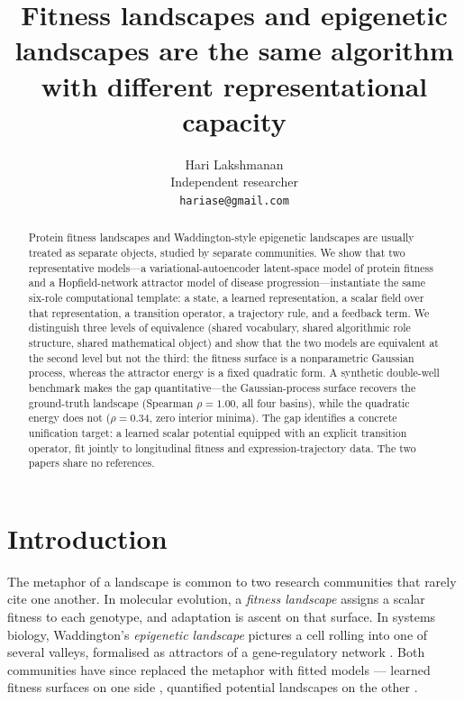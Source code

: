 \documentclass[11pt]{article}
\title{\bfseries Fitness landscapes and epigenetic landscapes are the same algorithm\\
\large with different representational capacity}
\author{Hari Lakshmanan\\ \small Independent researcher \\ \small\texttt{hariase@gmail.com}}
\date{}
\begin{document}
\maketitle
\vspace{-2.2em}
\begin{abstract}
Protein fitness landscapes and Waddington-style epigenetic landscapes are usually treated as separate objects, studied by separate communities. We show that two representative models---a variational-autoencoder latent-space model of protein fitness and a Hopfield-network attractor model of disease progression---instantiate the same six-role computational template: a state, a learned representation, a scalar field over that representation, a transition operator, a trajectory rule, and a feedback term. We distinguish three levels of equivalence (shared vocabulary, shared algorithmic role structure, shared mathematical object) and show that the two models are equivalent at the second level but not the third: the fitness surface is a nonparametric Gaussian process, whereas the attractor energy is a fixed quadratic form. A synthetic double-well benchmark makes the gap quantitative---the Gaussian-process surface recovers the ground-truth landscape (Spearman $\rho=1.00$, all four basins), while the quadratic energy does not ($\rho=0.34$, zero interior minima). The gap identifies a concrete unification target: a learned scalar potential equipped with an explicit transition operator, fit jointly to longitudinal fitness and expression-trajectory data. The two papers share no references.
\end{abstract}

\section{Introduction}
The metaphor of a landscape is common to two research communities that rarely cite one another. In molecular
evolution, a \emph{fitness landscape} assigns a scalar fitness to each genotype, and adaptation is ascent on that
surface. In systems biology, Waddington's \emph{epigenetic landscape} \citep{waddington1957strategy} pictures a cell
rolling into one of several valleys, formalised as attractors of a gene-regulatory network
\citep{huang2005cellfates}. Both communities have since replaced the metaphor with fitted models --- learned fitness
surfaces on one side \citep{riesselman2018deepseq,rives2021esm}, quantified potential landscapes on the other
\citep{wang2011waddington,huang2009cancer}.
\end{document}
